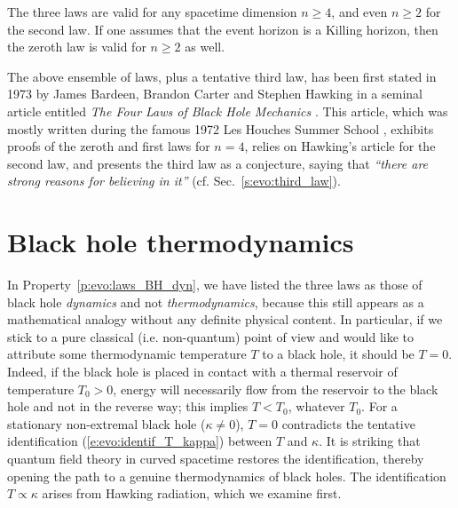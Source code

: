 \begin{remark}
The three laws are valid for any spacetime dimension $n\geq 4$, and even
$n\geq 2$ for the second law. If one assumes that the event horizon is a Killing
horizon, then the zeroth law is valid for $n\geq 2$ as well.
\end{remark}

\begin{hist}
The above ensemble of laws, plus a tentative third law, has been first stated in 1973 by
James Bardeen, Brandon Carter
and Stephen Hawking in a seminal article
entitled \emph{The Four Laws of Black Hole Mechanics} \cite{BardeCH73}. This
article, which was mostly written during the famous 1972 Les Houches Summer School \cite{DeWit73}, exhibits proofs of the zeroth and first laws for $n=4$,
relies on Hawking's article \cite{Hawki72} for the second law, and presents
the third law as a conjecture, saying that \emph{``there are strong reasons for believing in it''}
(cf. Sec.~\ref{s:evo:third_law}).
\end{hist}


\section{Black hole thermodynamics}

In Property~\ref{p:evo:laws_BH_dyn}, we have listed the three laws as those of black hole \emph{dynamics} and not \emph{thermodynamics}, because this still appears as a mathematical analogy without any definite physical content. In particular, if we stick to a
pure classical (i.e. non-quantum) point of view and would like to attribute some
thermodynamic temperature $T$ to a black hole, it should be $T=0$. Indeed, if the black hole is placed in contact with a thermal reservoir of temperature $T_0>0$, energy will necessarily flow from the reservoir to the black hole and not in the reverse way; this implies $T<T_0$, whatever $T_0$.
For a stationary non-extremal black hole ($\kappa\neq 0$), $T=0$ contradicts the tentative identification (\ref{e:evo:identif_T_kappa}) between $T$ and $\kappa$.
It is striking that quantum field theory in curved spacetime
restores the identification, thereby opening the path to a genuine thermodynamics of
black holes. The identification $T\propto \kappa$ arises from Hawking radiation,
which we examine first.

